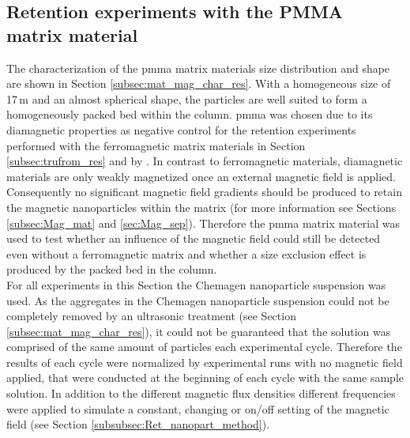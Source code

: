 %         



\subsection{Retention experiments with the PMMA matrix material}
\label{subsec:pmma_res}
The characterization of the \gls{pmma} matrix materials size distribution and shape are shown in Section \ref{subsec:mat_mag_char_res}. With a homogeneous size of 17\,\textmu m and an almost spherical shape, the particles are well suited to form a homogeneously packed bed within the column. \gls{pmma} was chosen due to its diamagnetic properties \cite{wapler2014magnetic} as negative control for the retention experiments performed with the ferromagnetic matrix materials in Section\,\ref{subsec:trufrom_res} and by \cite{AndreMaster}. In contrast to ferromagnetic materials, diamagnetic materials are only weakly magnetized once an external magnetic field is applied. Consequently no significant magnetic field gradients should be produced to retain the magnetic nanoparticles within the matrix (for more information see Sections\,\ref{subsec:Mag_mat} and \ref{sec:Mag_sep}). Therefore the \gls{pmma} matrix material was used to test whether an influence of the magnetic field could still be detected even without a ferromagnetic matrix and whether a size exclusion effect is produced by the packed bed in the column. \\
For all experiments in this Section the Chemagen nanoparticle suspension was used. 
As the aggregates in the Chemagen nanoparticle suspension could not be completely removed by an ultrasonic treatment (see Section \ref{subsec:mat_mag_char_res}), it could not be guaranteed that the solution was comprised of the same amount of particles each experimental cycle. Therefore the results of each cycle were normalized by experimental runs with no magnetic field applied, that were conducted at the beginning of each cycle with the same sample solution. In addition to the different magnetic flux densities different frequencies were applied to simulate a constant, changing or on/off setting of the magnetic field (see Section \ref{subsubsec:Ret_nanopart_method}). 

